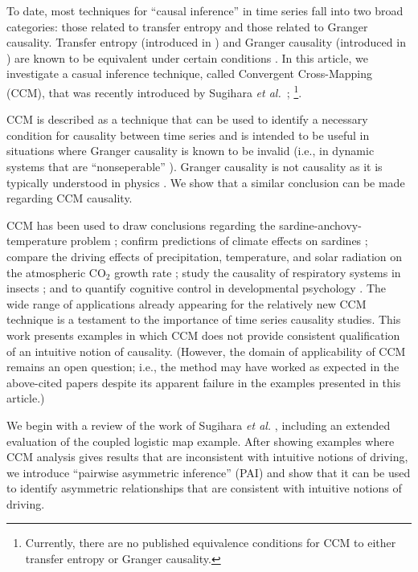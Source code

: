 \documentclass[twocolumn,aps,pre,groupedaddress]{revtex4-1}
\begin{document}
To date, most techniques for ``causal inference'' in time series fall into two broad categories: those related to transfer entropy and those related to Granger causality.  Transfer entropy (introduced in \cite{Schreiber2000}) and Granger causality (introduced in \cite{granger1969}) are known to be equivalent under certain conditions \cite{Barnett2009}.  In this article, we investigate a casual inference technique, called Convergent Cross-Mapping (CCM), that was recently introduced by Sugihara {\em et al.\ }\cite{Sugihara2012}; \footnote{Currently, there are no published equivalence conditions for CCM to either transfer entropy or Granger causality.}.

CCM is described as a technique that can be used to identify a necessary condition for causality between time series and is intended to be useful in situations where Granger causality is known to be invalid (i.e., in dynamic systems that are ``nonseperable'' \cite{Sugihara2012}). Granger causality is not causality as it is typically understood in physics \cite{Granger1980,liu2012,Roberts1985}.  We show that a similar conclusion can be made regarding CCM causality. 

CCM has been used to draw conclusions regarding the sardine-anchovy-temperature problem \cite{Sugihara2012}; confirm predictions of climate effects on sardines \cite{Deyle2013}; compare the driving effects of precipitation, temperature, and solar radiation on the atmospheric CO$_2$ growth rate \cite{Wang2014}; study the causality of respiratory systems in insects \cite{Bozorgmagham2013}; and to quantify cognitive control in developmental psychology \cite{Anastas2013}.  The wide range of applications already appearing for the relatively new CCM technique is a testament to the importance of time series causality studies.  This work presents examples in which CCM does not provide consistent qualification of an intuitive notion of causality.  (However, the domain of applicability of CCM remains an open question; i.e., the method may have worked as expected in the above-cited papers despite its apparent failure in the examples presented in this article.) 

We begin with a review of the work of Sugihara {\em et al.} \cite{Sugihara2012}, including an extended evaluation of the coupled logistic map example.  After showing examples where CCM analysis gives results that are inconsistent with intuitive notions of driving, we introduce ``pairwise asymmetric inference'' (PAI) and show that it can be used to identify asymmetric relationships that are consistent with intuitive notions of driving.
\end{document}
